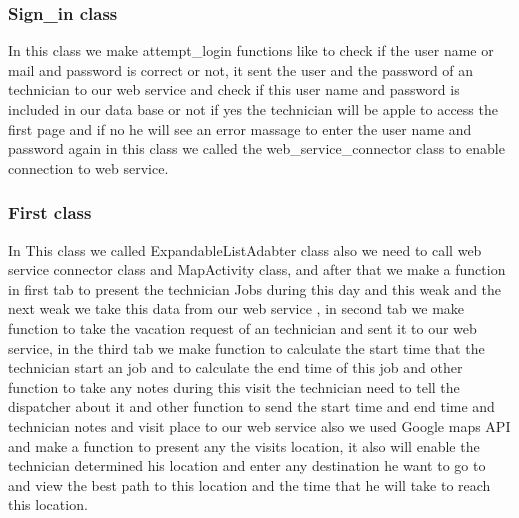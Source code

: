 	\subsubsection{Sign\_in class}
		In this class we make attempt\_login functions like to check if the user name or mail and password is correct or not, it sent the user and the password of an technician to our web service and check if this user name and password is included in our data base or not if yes the technician will be apple to access the first page and if no he will see an error massage to enter the user name and password again in this class we called the web\_service\_connector class to enable connection to web service.
	\subsubsection{First class}
		In This class we called ExpandableListAdabter class also we need to call web service connector class and MapActivity class, and after that we make a function in first tab to present the technician Jobs during this day and this weak and the next weak we take this data from our web service , in second tab we make function to take the vacation request of an technician and sent it to our web service, in the third tab we make function to calculate the start time that the technician start an job and to calculate the end time of this job and other function to take any notes during this visit the technician need to tell the dispatcher about it and other function to send the start time and end time and technician notes and visit place to our web service also we used Google maps API and make a function to present any the visits location, it also will enable the technician determined his location and enter any destination he want to go to and view the best path to this location and the time that he will take to reach this location.